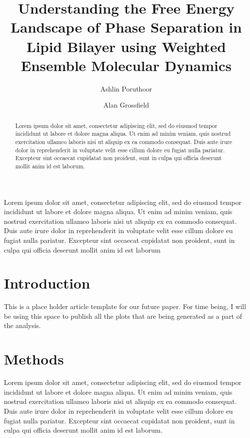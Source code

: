 \documentclass{biophys-new}
\title{Understanding the Free Energy Landscape of Phase Separation in Lipid Bilayer using Weighted Ensemble Molecular Dynamics}
\author[1]{Ashlin Poruthoor}
\author[1,*]{Alan Grossfield}
\affil[1]{University of Rochester Medical Center, Rochester, NY 14620}
\begin{document}
\begin{frontmatter}
\begin{abstract}

Lorem ipsum dolor sit amet, consectetur adipiscing elit, sed do eiusmod tempor incididunt ut labore et dolore magna aliqua. Ut enim ad minim veniam, quis nostrud exercitation ullamco laboris nisi ut aliquip ex ea commodo consequat. Duis aute irure dolor in reprehenderit in voluptate velit esse cillum dolore eu fugiat nulla pariatur. Excepteur sint occaecat cupidatat non proident, sunt in culpa qui officia deserunt mollit anim id est laborum.

\end{abstract}

\begin{sigstatement}

Lorem ipsum dolor sit amet, consectetur adipiscing elit, sed do eiusmod tempor incididunt ut labore et dolore magna aliqua. Ut enim ad minim veniam, quis nostrud exercitation ullamco laboris nisi ut aliquip ex ea commodo consequat. Duis aute irure dolor in reprehenderit in voluptate velit esse cillum dolore eu fugiat nulla pariatur. Excepteur sint occaecat cupidatat non proident, sunt in culpa qui officia deserunt mollit anim id est laborum

\end{sigstatement}

\end{frontmatter}

\section*{Introduction}

This is a place holder article template for our future paper. For time being, I will be using this 
space to publish all the plots that are being generated as a part of the analysis.

\section*{Methods}

Lorem ipsum dolor sit amet, consectetur adipiscing elit, sed do eiusmod tempor incididunt ut labore et dolore magna aliqua. Ut enim ad minim veniam, quis nostrud exercitation ullamco laboris nisi ut aliquip ex ea commodo consequat. Duis aute irure dolor in reprehenderit in voluptate velit esse cillum dolore eu fugiat nulla pariatur. Excepteur sint occaecat cupidatat non proident, sunt in culpa qui officia deserunt mollit anim id est laborum.
\end{document}
